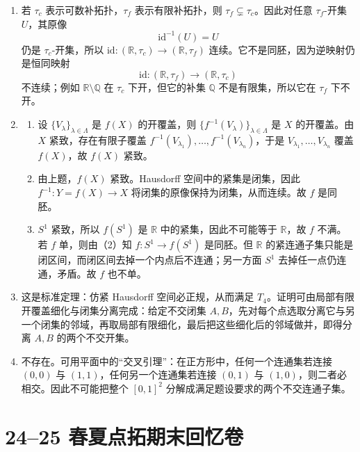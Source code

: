 \documentclass{article}
\newcommand{\R}{\mathbb{R}}
\newcommand{\Q}{\mathbb{Q}}
\begin{document}
\begin{enumerate}
  \item 若 $\tau_c$ 表示可数补拓扑，$\tau_f$ 表示有限补拓扑，则 $\tau_f\subsetneq \tau_c$。因此对任意 $\tau_f$-开集 $U$，其原像
        \[
          \mathrm{id}^{-1}(U)=U
        \]
        仍是 $\tau_c$-开集，所以 $\mathrm{id}:(\R,\tau_c)\to(\R,\tau_f)$ 连续。它不是同胚，因为逆映射仍是恒同映射
        \[
          \mathrm{id}:(\R,\tau_f)\to(\R,\tau_c)
        \]
        不连续；例如 $\R\setminus\Q$ 在 $\tau_c$ 下开，但它的补集 $\Q$ 不是有限集，所以它在 $\tau_f$ 下不开。

  \item
        \begin{enumerate}
          \item 设 $\{V_\lambda\}_{\lambda\in\Lambda}$ 是 $f(X)$ 的开覆盖，则 $\{f^{-1}(V_\lambda)\}_{\lambda\in\Lambda}$ 是 $X$ 的开覆盖。由 $X$ 紧致，存在有限子覆盖 $f^{-1}(V_{\lambda_1}),\dots,f^{-1}(V_{\lambda_n})$，于是 $V_{\lambda_1},\dots,V_{\lambda_n}$ 覆盖 $f(X)$，故 $f(X)$ 紧致。

          \item 由上题，$f(X)$ 紧致。Hausdorff 空间中的紧集是闭集，因此 $f^{-1}:Y=f(X)\to X$ 将闭集的原像保持为闭集，从而连续。故 $f$ 是同胚。

          \item $S^1$ 紧致，所以 $f(S^1)$ 是 $\R$ 中的紧集，因此不可能等于 $\R$，故 $f$ 不满。若 $f$ 单，则由（2）知 $f:S^1\to f(S^1)$ 是同胚。但 $\R$ 的紧连通子集只能是闭区间，而闭区间去掉一个内点后不连通；另一方面 $S^1$ 去掉任一点仍连通，矛盾。故 $f$ 也不单。
        \end{enumerate}

  \item 这是标准定理：仿紧 Hausdorff 空间必正规，从而满足 $T_4$。证明可由局部有限开覆盖细化与闭集分离完成：给定不交闭集 $A,B$，先对每个点选取分离它与另一个闭集的邻域，再取局部有限细化，最后把这些细化后的邻域做并，即得分离 $A,B$ 的两个不交开集。

  \item 不存在。可用平面中的“交叉引理”：在正方形中，任何一个连通集若连接 $(0,0)$ 与 $(1,1)$，任何另一个连通集若连接 $(0,1)$ 与 $(1,0)$，则二者必相交。因此不可能把整个 $[0,1]^2$ 分解成满足题设要求的两个不交连通子集。
\end{enumerate}

\section{24--25 春夏点拓期末回忆卷}
\end{document}
